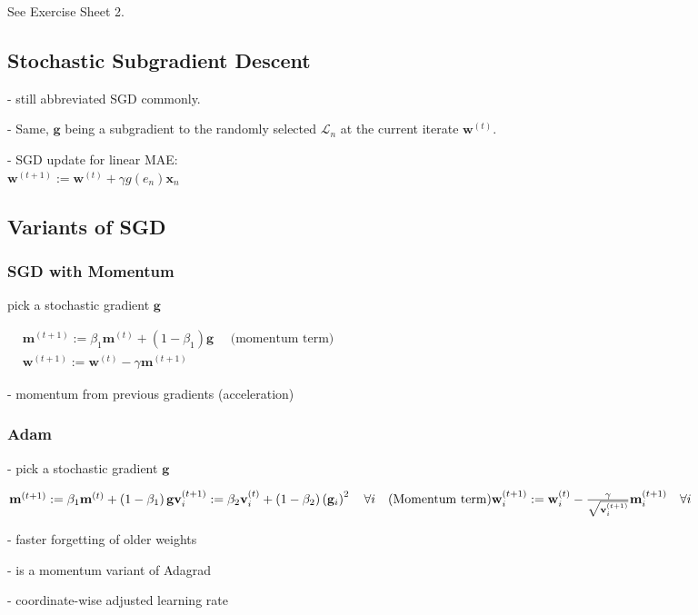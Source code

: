See Exercise Sheet 2.

\subsection*{Stochastic Subgradient Descent}
- still abbreviated SGD commonly.

- Same, $\mathbf{g}$ being a subgradient to the randomly selected $\mathcal{L}_{n}$ at the current iterate $\mathbf{w}^{(t)}$.

- SGD update for linear MAE: \\ $\mathbf{w}^{(t+1)}:=\mathbf{w}^{(t)}+\gamma g(e_n)\mathbf{x}_n$

\subsection*{Variants of SGD}
\subsubsection*{SGD with Momentum}
pick a stochastic gradient $\mathbf{g}$

$
\begin{aligned}
& \mathbf{m}^{(t+1)}:=\beta_{1} \mathbf{m}^{(t)}+\left(1-\beta_{1}\right) \mathbf{g} \quad \text { (momentum term) } \\
& \mathbf{w}^{(t+1)}:=\mathbf{w}^{(t)}-\gamma \mathbf{m}^{(t+1)}
\end{aligned}
$

- momentum from previous gradients (acceleration)

\subsubsection*{Adam}
- pick a stochastic gradient $\mathbf{g}$

$
\mathbf{m}^{(t+1)} := \beta_{1} \mathbf{m}^{(t)} + \left(1-\beta_{1}\right) \mathbf{g} \\
\mathbf{v}_{i}^{(t+1)} := \beta_{2} \mathbf{v}_{i}^{(t)} + \left(1-\beta_{2}\right)\left(\mathbf{g}_{i}\right)^{2} \quad \forall i \quad \text{(Momentum term)} \\
\mathbf{w}_{i}^{(t+1)} := \mathbf{w}_{i}^{(t)} - \frac{\gamma}{\sqrt{\mathbf{v}_{i}^{(t+1)}}} \mathbf{m}_{i}^{(t+1)} \quad \forall i
$

- faster forgetting of older weights

- is a momentum variant of Adagrad

- coordinate-wise adjusted learning rate

